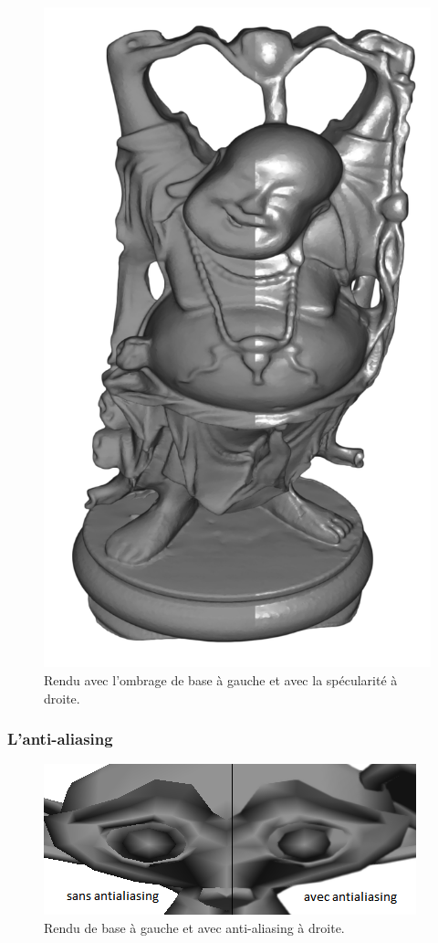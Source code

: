 \begin{figure}[h!]
	\centering
	\includegraphics[scale=0.23]{images/rendu_specular.png}
	\caption{\label{fig:screenSpecular.png} Rendu avec l'ombrage de base à gauche et avec la spécularité à droite. \protect}
\end{figure}

\subsubsection{L'anti-aliasing}

\begin{figure}[h!]
	\centering
	\includegraphics[scale=0.4]{images/antialiasing.png}
	\caption{\label{fig:antialiasing.png} Rendu de base à gauche et avec anti-aliasing à droite. \protect}
\end{figure}

